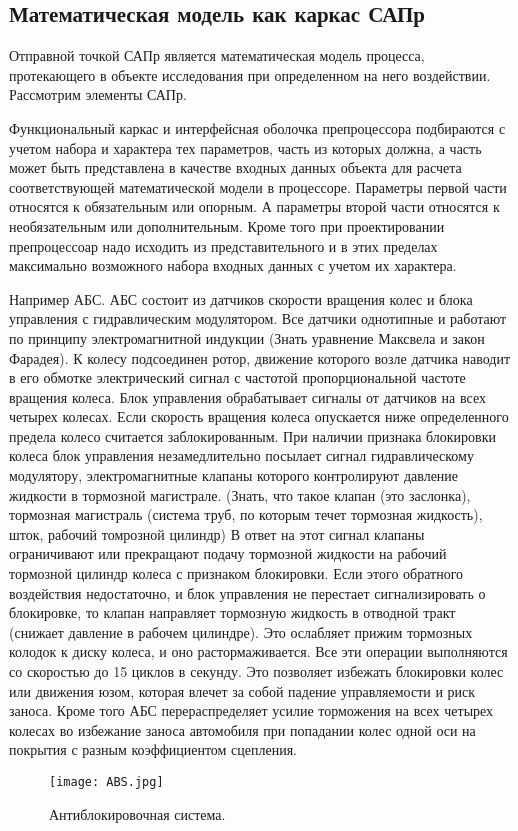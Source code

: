 \subsection{Математическая модель как каркас САПр}
Отправной точкой САПр является математическая модель процесса, протекающего в
объекте исследования при определенном на него воздействии. Рассмотрим элементы 
САПр.\par
Функциональный каркас и интерфейсная оболочка препроцессора подбираются с 
учетом набора и характера тех параметров, часть из которых должна, а часть 
может быть представлена в качестве входных данных объекта для расчета
соответствующей математической модели в процессоре. Параметры первой части
относятся к обязательным или опорным. А параметры второй части относятся к
необязательным или дополнительным. Кроме того при проектировании препроцессоар
надо исходить из представительного и в этих пределах максимально возможного
набора входных данных с учетом их характера.\par
Например АБС. АБС состоит из датчиков скорости вращения колес и блока управления
с гидравлическим модулятором. Все датчики однотипные и работают по принципу
электромагнитной индукции {\ttfamily (Знать уравнение Максвела и закон
Фарадея)}. К колесу подсоединен ротор, движение которого возле датчика наводит в
его обмотке электрический сигнал с частотой пропорциональной частоте вращения
колеса. Блок управления обрабатывает сигналы от датчиков на всех четырех
колесах. Если скорость вращения колеса опускается ниже определенного предела
колесо считается заблокированным. При наличии признака блокировки колеса блок
управления незамедлительно посылает сигнал гидравлическому модулятору,
электромагнитные клапаны которого контролируют давление жидкости в тормозной
магистрале. {\ttfamily (Знать, что такое клапан (это заслонка), тормозная
магистраль (система труб, по которым течет тормозная жидкость), шток, рабочий томрозной
цилиндр)} В ответ на этот сигнал клапаны ограничивают или прекращают подачу 
тормозной жидкости на рабочий тормозной цилиндр колеса с признаком блокировки.
Если этого обратного воздействия недостаточно, и блок управления не перестает
сигнализировать о блокировке, то клапан направляет тормозную жидкость в отводной
тракт (снижает давление в рабочем цилиндре). Это ослабляет прижим тормозных
колодок к диску колеса, и оно растормаживается. Все эти операции выполняются со
скоростью до 15 циклов в секунду. Это позволяет избежать блокировки колес или
движения юзом, которая влечет за собой падение управляемости и риск заноса.
Кроме того АБС перераспределяет усилие торможения на всех четырех колесах во
избежание заноса автомобиля при попадании колес одной оси на покрытия с разным
коэффициентом сцепления.
\begin{figure}
  \centering
  \texttt{[image: ABS.jpg]}
  \caption{Антиблокировочная система.}
  \label{abs_img}
\end{figure}

